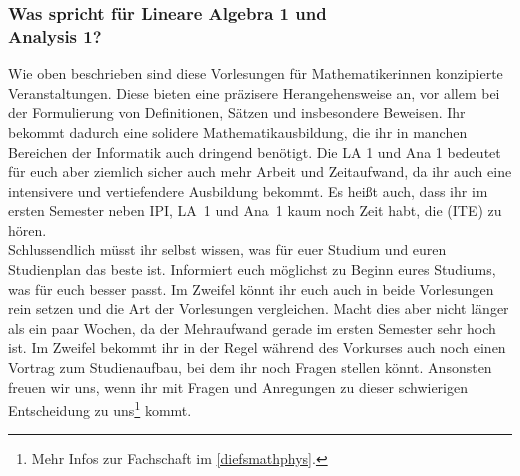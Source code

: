 \subsubsection{Was spricht für Lineare Algebra 1 und\\Analysis 1?}
Wie oben beschrieben sind diese Vorlesungen für Mathematikerinnen konzipierte Veranstaltungen. Diese bieten eine präzisere Herangehensweise an, vor allem bei der Formulierung von Definitionen, Sätzen und insbesondere Beweisen. Ihr bekommt dadurch eine solidere Mathematikausbildung, die ihr in manchen Bereichen der Informatik auch dringend benötigt. Die \gls{LA} 1 und \gls{Ana} 1 bedeutet für euch aber ziemlich sicher auch mehr Arbeit und Zeitaufwand, da ihr auch eine intensivere und vertiefendere Ausbildung bekommt. Es heißt auch, dass ihr im ersten Semester neben \gls{IPI}, \gls{LA}~1 und \gls{Ana}~1 kaum noch Zeit habt, die  (\gls{ITE}) zu hören.\\

Schlussendlich müsst ihr selbst wissen, was für euer Studium und euren Studienplan das beste ist. Informiert euch möglichst zu Beginn eures Studiums, was für euch besser passt. Im Zweifel könnt ihr euch auch in beide Vorlesungen rein setzen und die Art der Vorlesungen vergleichen. Macht dies aber nicht länger als ein paar Wochen, da der Mehraufwand gerade im ersten Semester sehr hoch ist. Im Zweifel bekommt ihr in der Regel während des Vorkurses auch noch einen Vortrag zum Studienaufbau, bei dem ihr noch Fragen stellen könnt. Ansonsten freuen wir uns, wenn ihr mit Fragen und Anregungen zu dieser schwierigen Entscheidung zu uns\footnote{Mehr Infos zur Fachschaft im \autoref{diefsmathphys}.} kommt.
